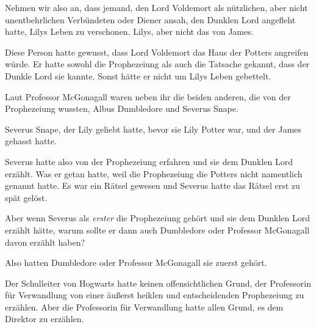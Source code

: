 Nehmen wir also an, dass jemand, den Lord Voldemort als nützlichen, aber nicht unentbehrlichen Verbündeten oder Diener ansah, den Dunklen Lord angefleht hatte, Lilys Leben zu verschonen. Lilys, aber nicht das von James.

Diese Person hatte gewusst, dass Lord Voldemort das Haus der Potters angreifen würde. Er hatte sowohl die Prophezeiung als auch die Tatsache gekannt, dass der Dunkle Lord sie kannte. Sonst hätte er nicht um Lilys Leben gebettelt.

Laut Professor McGonagall waren neben ihr die beiden anderen, die von der Prophezeiung wussten, Albus Dumbledore und Severus Snape.

Severus Snape, der Lily geliebt hatte, bevor sie Lily Potter war, und der James gehasst hatte.

Severus hatte also von der Prophezeiung erfahren und sie dem Dunklen Lord erzählt. Was er getan hatte, weil die Prophezeiung die Potters nicht namentlich genannt hatte. Es war ein Rätsel gewesen und Severus hatte das Rätsel erst zu spät gelöst.

Aber wenn Severus als \emph{erster} die Prophezeiung gehört und sie dem Dunklen Lord erzählt hätte, warum sollte er dann auch Dumbledore oder Professor McGonagall davon erzählt haben?

Also hatten Dumbledore oder Professor McGonagall sie zuerst gehört.

Der Schulleiter von Hogwarts hatte keinen offensichtlichen Grund, der Professorin für Verwandlung von einer äußerst heiklen und entscheidenden Prophezeiung zu erzählen. Aber die Professorin für Verwandlung hatte allen Grund, es dem Direktor zu erzählen.


